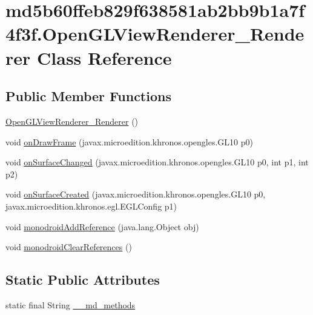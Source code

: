 \hypertarget{classmd5b60ffeb829f638581ab2bb9b1a7f4f3f_1_1_open_g_l_view_renderer___renderer}{
\section{md5b60ffeb829f638581ab2bb9b1a7f4f3f.OpenGLViewRenderer\_\-Renderer Class Reference}
\label{classmd5b60ffeb829f638581ab2bb9b1a7f4f3f_1_1_open_g_l_view_renderer___renderer}
}
\subsection*{Public Member Functions}
\begin{CompactItemize}
\item 
\hyperlink{classmd5b60ffeb829f638581ab2bb9b1a7f4f3f_1_1_open_g_l_view_renderer___renderer_64d2471c4a14d5f52ae6b73cff76c165}{OpenGLViewRenderer\_\-Renderer} ()
\item 
void \hyperlink{classmd5b60ffeb829f638581ab2bb9b1a7f4f3f_1_1_open_g_l_view_renderer___renderer_13437d07738622115709479669ef46a0}{onDrawFrame} (javax.microedition.khronos.opengles.GL10 p0)
\item 
void \hyperlink{classmd5b60ffeb829f638581ab2bb9b1a7f4f3f_1_1_open_g_l_view_renderer___renderer_6ec5c9b9fc4c374d02ce3788d6ad6a64}{onSurfaceChanged} (javax.microedition.khronos.opengles.GL10 p0, int p1, int p2)
\item 
void \hyperlink{classmd5b60ffeb829f638581ab2bb9b1a7f4f3f_1_1_open_g_l_view_renderer___renderer_7232536fa62d31b5e230568c18189110}{onSurfaceCreated} (javax.microedition.khronos.opengles.GL10 p0, javax.microedition.khronos.egl.EGLConfig p1)
\item 
void \hyperlink{classmd5b60ffeb829f638581ab2bb9b1a7f4f3f_1_1_open_g_l_view_renderer___renderer_bd5994165886f576dadade7f97fa0317}{monodroidAddReference} (java.lang.Object obj)
\item 
void \hyperlink{classmd5b60ffeb829f638581ab2bb9b1a7f4f3f_1_1_open_g_l_view_renderer___renderer_c2a1d806a5c6a2de5728d94cd3894aa8}{monodroidClearReferences} ()
\end{CompactItemize}
\subsection*{Static Public Attributes}
\begin{CompactItemize}
\item 
static final String \hyperlink{classmd5b60ffeb829f638581ab2bb9b1a7f4f3f_1_1_open_g_l_view_renderer___renderer_571e71003f6b143de8e407be41c7b3d3}{\_\-\_\-md\_\-methods}
\end{CompactItemize}
